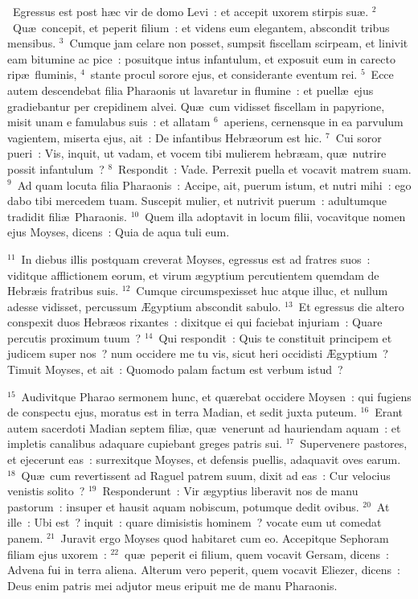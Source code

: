 ~\lettrine[lines=10,image=true,loversize=0.05,lraise=-0.03]{E}{}gressus est post h\ae c vir de domo Levi~: et accepit uxorem stirpis su\ae .
${}^{2}$~Qu\ae\ concepit, et peperit filium~: et videns eum elegantem, abscondit tribus mensibus.
${}^{3}$~Cumque jam celare non posset, sumpsit fiscellam scirpeam, et linivit eam bitumine ac pice~: posuitque intus infantulum, et exposuit eum in carecto rip\ae\ fluminis,
${}^{4}$~stante procul sorore ejus, et considerante eventum rei.
${}^{5}$~Ecce autem descendebat filia Pharaonis ut lavaretur in flumine~: et puell\ae\ ejus gradiebantur per crepidinem alvei. Qu\ae\ cum vidisset fiscellam in papyrione, misit unam e famulabus suis~: et allatam
${}^{6}$~aperiens, cernensque in ea parvulum vagientem, miserta ejus, ait~: De infantibus Hebr\ae orum est hic.
${}^{7}$~Cui soror pueri~: Vis, inquit, ut vadam, et vocem tibi mulierem hebr\ae am, qu\ae\ nutrire possit infantulum~?
${}^{8}$~Respondit~: Vade. Perrexit puella et vocavit matrem suam.
${}^{9}$~Ad quam locuta filia Pharaonis~: Accipe, ait, puerum istum, et nutri mihi~: ego dabo tibi mercedem tuam. Suscepit mulier, et nutrivit puerum~: adultumque tradidit fili\ae\ Pharaonis.
${}^{10}$~Quem illa adoptavit in locum filii, vocavitque nomen ejus Moyses, dicens~: Quia de aqua tuli eum.


${}^{11}$~In diebus illis postquam creverat Moyses, egressus est ad fratres suos~: viditque afflictionem eorum, et virum \ae gyptium percutientem quemdam de Hebr\ae is fratribus suis.
${}^{12}$~Cumque circumspexisset huc atque illuc, et nullum adesse vidisset, percussum \AE gyptium abscondit sabulo.
${}^{13}$~Et egressus die altero conspexit duos Hebr\ae os rixantes~: dixitque ei qui faciebat injuriam~: Quare percutis proximum tuum~?
${}^{14}$~Qui respondit~: Quis te constituit principem et judicem super nos~? num occidere me tu vis, sicut heri occidisti \AE gyptium~? Timuit Moyses, et ait~: Quomodo palam factum est verbum istud~?


${}^{15}$~Audivitque Pharao sermonem hunc, et qu\ae rebat occidere Moysen~: qui fugiens de conspectu ejus, moratus est in terra Madian, et sedit juxta puteum.
${}^{16}$~Erant autem sacerdoti Madian septem fili\ae , qu\ae\ venerunt ad hauriendam aquam~: et impletis canalibus adaquare cupiebant greges patris sui.
${}^{17}$~Supervenere pastores, et ejecerunt eas~: surrexitque Moyses, et defensis puellis, adaquavit oves earum.
${}^{18}$~Qu\ae\ cum revertissent ad Raguel patrem suum, dixit ad eas~: Cur velocius venistis solito~?
${}^{19}$~Responderunt~: Vir \ae gyptius liberavit nos de manu pastorum~: insuper et hausit aquam nobiscum, potumque dedit ovibus.
${}^{20}$~At ille~: Ubi est~? inquit~: quare dimisistis hominem~? vocate eum ut comedat panem.
${}^{21}$~Juravit ergo Moyses quod habitaret cum eo. Accepitque Sephoram filiam ejus uxorem~:
${}^{22}$~qu\ae\ peperit ei filium, quem vocavit Gersam, dicens~: Advena fui in terra aliena. Alterum vero peperit, quem vocavit Eliezer, dicens~: Deus enim patris mei adjutor meus eripuit me de manu Pharaonis.


